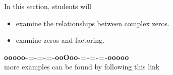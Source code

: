 \documentclass{ximera}
\begin{document}
\begin{sectionOutcomes}
In this section, students will 

\begin{itemize}
\item examine the relationships between complex zeros.
\item examine zeros and factoring.
\end{itemize}
\end{sectionOutcomes}










\begin{center}
\textbf{\textcolor{green!50!black}{ooooo-=-=-=-ooOoo-=-=-=-ooooo}} \\

more examples can be found by following this link\\ 

\end{center}
\end{document}
